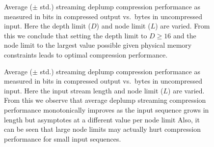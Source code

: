 %
\begin{figure}[t] 
	\begin{center}
		\caption{Average ($\pm$ std.) streaming deplump compression performance as measured in bits in compressed output vs.~bytes in uncompressed input.  Here the depth limit ($D$) and node limit ($L$) are varied.  From this we conclude that setting the depth limit to $D\geq16$ and the node limit to the largest value possible given physical memory constraints leads to optimal compression performance.}
		\label{fig:varying_depths}
	\end{center} 
\end{figure} 
%
%
\begin{figure}[t] 
	\begin{center}
		\caption{Average ($\pm$ std.) streaming deplump compression performance as measured in bits in compressed output vs.~bytes in uncompressed input.  Here the input stream length and node limit ($L$) are varied.  From this we observe that average deplump streaming compression performance monotonically improves as the input sequence grows in length but asymptotes at a different value per node limit  Also, it can be seen that large node limits may actually hurt compression performance for small input sequences.}
		\label{fig:varying_stream_length}
	\end{center} 
\end{figure} 
%
